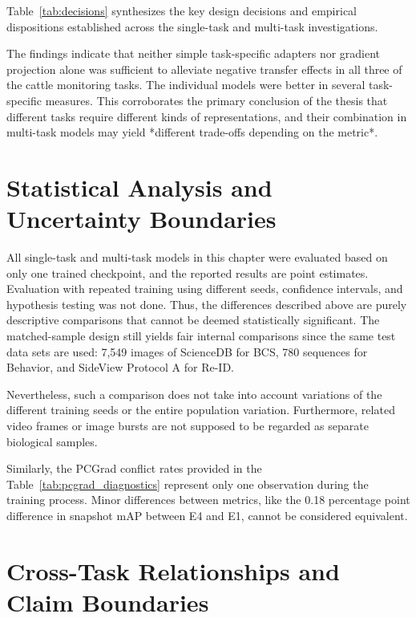 Table~\ref{tab:decisions} synthesizes the key design decisions and empirical dispositions established across the single-task and multi-task investigations.



The findings indicate that neither simple task-specific adapters nor gradient projection alone was sufficient to alleviate negative transfer effects in all three of the cattle monitoring tasks. The individual models were better in several task-specific measures. This corroborates the primary conclusion of the thesis that different tasks require different kinds of representations, and their combination in multi-task models may yield *different trade-offs depending on the metric*.

\section{Statistical Analysis and Uncertainty Boundaries}

All single-task and multi-task models in this chapter were evaluated based on only one trained checkpoint, and the reported results are point estimates. Evaluation with repeated training using different seeds, confidence intervals, and hypothesis testing was not done. Thus, the differences described above are purely descriptive comparisons that cannot be deemed statistically significant. The matched-sample design still yields fair internal comparisons since the same test data sets are used: 7,549 images of ScienceDB for BCS, 780 sequences for Behavior, and SideView Protocol A for Re-ID.

Nevertheless, such a comparison does not take into account variations of the different training seeds or the entire population variation. Furthermore, related video frames or image bursts are not supposed to be regarded as separate biological samples.

Similarly, the PCGrad conflict rates provided in the Table~\ref{tab:pcgrad_diagnostics} represent only one observation during the training process. Minor differences between metrics, like the 0.18 percentage point difference in snapshot mAP between E4 and E1, cannot be considered equivalent.

\section{Cross-Task Relationships and Claim Boundaries}

